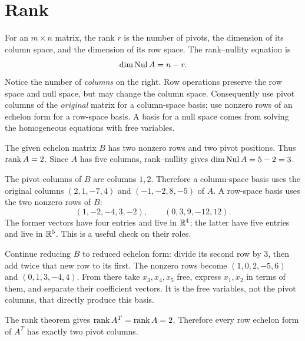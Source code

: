 \section{Rank}
For an $m\times n$ matrix, the rank $r$ is the number of pivots, the
dimension of its column space, and the dimension of its row space. The
rank--nullity equation is
\[
 \dim\operatorname{Nul} A=n-r.
\]
Notice the number of \emph{columns} on the right. Row operations preserve
the row space and null space, but may change the column space. Consequently
use pivot columns of the \emph{original} matrix for a column-space basis;
use nonzero rows of an echelon form for a row-space basis. A basis for a
null space comes from solving the homogeneous equations with free variables.

The given echelon matrix $B$ has two nonzero rows and two pivot positions.
Thus $\operatorname{rank} A=2$. Since $A$ has five columns, rank--nullity gives
$\dim\operatorname{Nul} A=5-2=3$.

The pivot columns of $B$ are columns $1,2$. Therefore a column-space basis
uses the original columns $(2,1,-7,4)$ and $(-1,-2,8,-5)$ of $A$.
A row-space basis uses the two nonzero rows of $B$:
\[
 (1,-2,-4,3,-2),\qquad(0,3,9,-12,12).
\]
The former vectors have four entries and live in $\mathbb{R}^4$; the latter have
five entries and live in $\mathbb{R}^5$. This is a useful check on their roles.

Continue reducing $B$ to reduced echelon form: divide its second row by
$3$, then add twice that new row to its first. The nonzero rows become
$(1,0,2,-5,6)$ and $(0,1,3,-4,4)$. From there take $x_3,x_4,x_5$ free,
express $x_1,x_2$ in terms of them, and separate their coefficient vectors.
It is the free variables, not the pivot columns, that directly produce this basis.

The rank theorem gives $\operatorname{rank} A^T=\operatorname{rank} A=2$. Therefore every row echelon
form of $A^T$ has exactly two pivot columns.

